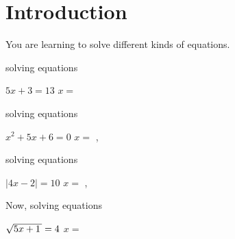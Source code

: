 \section{Introduction}

You are learning to solve different kinds of equations.

\begin{tcbraster}[
    raster equal height, 
    raster columns = 2,
    raster column skip = 0.5in,
]
    \begin{tcolorbox}[colback=white,boxrule=0.5pt,]
        \raggedright
        {\small solving  equations \phantom{xxxxxxx}}
        \begin{center}
            \small
            $5x +3 = 13$
            \quad{\large$\Rightarrow$}\quad
            $x =$ 
        \end{center}
        \whenSTUDENT{
            \vspace{1.5\onelineskip}
        }
    \end{tcolorbox}
    \begin{tcolorbox}[colback=white,boxrule=0.5pt,]
        \raggedright
        {\small solving  equations}
        \begin{center}
            \small
            $x^2 + 5x + 6 = 0$
            \quad{\large$\Rightarrow$}\quad
            $x =$ , 
        \end{center}
        \whenSTUDENT{
            \vspace{1.5\onelineskip}
        }
    \end{tcolorbox}
    \begin{tcolorbox}[colback=white,boxrule=0.5pt,]
        \raggedright
        {\small solving  equations}
        \begin{center}
            \small
            $|4x -2 | = 10$
            \quad{\large$\Rightarrow$}\quad
            $x =$ , 
        \end{center}
        \whenSTUDENT{
            \vspace{1.5\onelineskip}
        }
    \end{tcolorbox}
    \begin{tcolorbox}[colback=white,boxrule=2pt,]
        \raggedright
        {\small Now, solving  equations}
        \begin{center}
            \small
            $\myRoot{5x+1} = 4$
            \quad{\large$\Rightarrow$}\quad
            $x =$ 
        \end{center}
        \whenSTUDENT{
            \vspace{1.5\onelineskip}
        }
    \end{tcolorbox}
\end{tcbraster}

